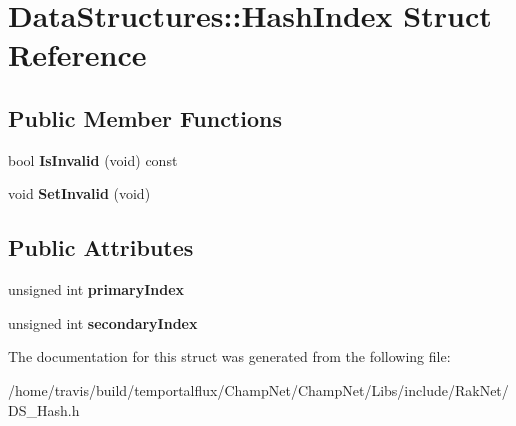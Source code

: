 \hypertarget{struct_data_structures_1_1_hash_index}{\section{Data\-Structures\-:\-:Hash\-Index Struct Reference}
\label{struct_data_structures_1_1_hash_index}
}
\subsection*{Public Member Functions}
\begin{DoxyCompactItemize}
\item 
\hypertarget{struct_data_structures_1_1_hash_index_a5d5347b85316db1181a65fc05a388460}{bool {\bfseries Is\-Invalid} (void) const }\label{struct_data_structures_1_1_hash_index_a5d5347b85316db1181a65fc05a388460}

\item 
\hypertarget{struct_data_structures_1_1_hash_index_a4c44571a28cd27230291cc664259faed}{void {\bfseries Set\-Invalid} (void)}\label{struct_data_structures_1_1_hash_index_a4c44571a28cd27230291cc664259faed}

\end{DoxyCompactItemize}
\subsection*{Public Attributes}
\begin{DoxyCompactItemize}
\item 
\hypertarget{struct_data_structures_1_1_hash_index_ab9173cc3dec89e40448903a5d2a5790a}{unsigned int {\bfseries primary\-Index}}\label{struct_data_structures_1_1_hash_index_ab9173cc3dec89e40448903a5d2a5790a}

\item 
\hypertarget{struct_data_structures_1_1_hash_index_a08355105123aa12ab7bc04b5b4c7eda0}{unsigned int {\bfseries secondary\-Index}}\label{struct_data_structures_1_1_hash_index_a08355105123aa12ab7bc04b5b4c7eda0}

\end{DoxyCompactItemize}


The documentation for this struct was generated from the following file\-:\begin{DoxyCompactItemize}
\item 
/home/travis/build/temportalflux/\-Champ\-Net/\-Champ\-Net/\-Libs/include/\-Rak\-Net/D\-S\-\_\-\-Hash.\-h\end{DoxyCompactItemize}
